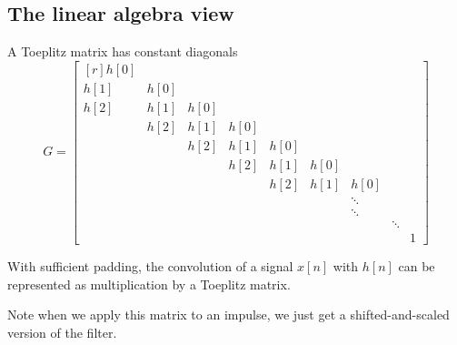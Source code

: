 \subsection{The linear algebra view}
A Toeplitz matrix has constant diagonals
\[ %
 G = 
 \begin{bmatrix*}[r]
    h[0] \\
    h[1] &h[0]\\
    h[2] &h[1] & h[0]\\
    &h[2] &h[1] & h[0]\\
    &&h[2] &h[1] & h[0]\\
    &&&h[2] &h[1] & h[0]\\
    &&&&h[2] &h[1] & h[0]\\
    &&&&&&\ddots\\
    &&&&&&\ddots\\
    &&&&&&&\ddots\\
    &&&&&&&&1
  \end{bmatrix*}
\]

With sufficient padding, the convolution of a signal $x[n]$ with
$h[n]$ can be represented as multiplication by a Toeplitz matrix. 

Note when we apply this matrix to an impulse, we just
get a shifted-and-scaled version of the filter.  


